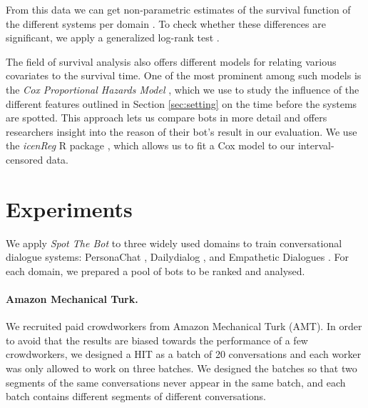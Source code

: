 \documentclass[11pt,a4paper]{article}
\begin{document}
From this data we can get non-parametric estimates of the survival function of the different systems per domain \citep{nonparametric_survival_censored}.  To check whether these differences are significant, we apply a generalized log-rank test \citep{generalized_logranktest_zhao2004}.

The field of survival analysis also offers different models for relating various covariates to the survival time. One of the most prominent among such models is the \emph{Cox Proportional Hazards Model} \citep{cox_ph_model}, which we use to study the influence of the different features outlined in Section \ref{sec:setting} on the time before the systems are spotted. This approach lets us compare bots in more detail and offers researchers insight into the reason of their bot's result in our evaluation.  We use the \emph{icenReg} R package \citep{icenReg}, which allows us to fit a Cox model to our interval-censored data.

\section{Experiments}
We apply \emph{Spot The Bot} to three widely used domains to train conversational dialogue systems: PersonaChat \cite{zhang-etal-2018-personalizing}, Dailydialog \cite{li-etal-2017-dailydialog}, and Empathetic Dialogues \cite{rashkin-etal-2019-towards}. For each domain, we prepared a pool of bots to be ranked and analysed. 


\paragraph{Amazon Mechanical Turk.} We recruited paid crowdworkers from Amazon Mechanical Turk (AMT). In order to avoid that the results are biased towards the performance of a few crowdworkers, we designed a HIT as a batch of 20 conversations and each worker was only allowed to work on three batches. We designed the batches so that two segments of the same conversations never appear in the same batch, and each batch contains different segments of different conversations.  
\end{document}
